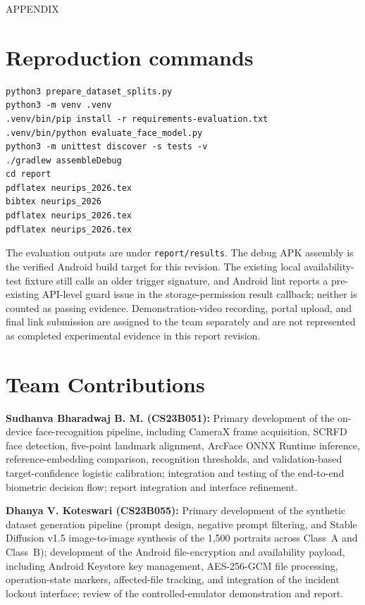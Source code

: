 \documentclass{article}
\begin{document}



\newpage
{\Large APPENDIX}
\appendix
\section{Reproduction commands}

\begin{verbatim}
python3 prepare_dataset_splits.py
python3 -m venv .venv
.venv/bin/pip install -r requirements-evaluation.txt
.venv/bin/python evaluate_face_model.py
python3 -m unittest discover -s tests -v
./gradlew assembleDebug
cd report
pdflatex neurips_2026.tex
bibtex neurips_2026
pdflatex neurips_2026.tex
pdflatex neurips_2026.tex
\end{verbatim}

The evaluation outputs are under \texttt{report/results}. The debug APK assembly is the verified Android build target for this revision. The existing local availability-test fixture still calls an older trigger signature, and Android lint reports a pre-existing API-level guard issue in the storage-permission result callback; neither is counted as passing evidence. Demonstration-video recording, portal upload, and final link submission are assigned to the team separately and are not represented as completed experimental evidence in this report revision.

\section{Team Contributions}

\textbf{Sudhanva Bharadwaj B. M. (CS23B051):} Primary development of the on-device face-recognition pipeline, including CameraX frame acquisition, SCRFD face detection, five-point landmark alignment, ArcFace ONNX Runtime inference, reference-embedding comparison, recognition thresholds, and validation-based target-confidence logistic calibration; integration and testing of the end-to-end biometric decision flow; report integration and interface refinement.

\textbf{Dhanya V. Koteswari (CS23B055):} Primary development of the synthetic dataset generation pipeline (prompt design, negative prompt filtering, and Stable Diffusion v1.5 image-to-image synthesis of the 1,500 portraits across Class~A and Class~B); development of the Android file-encryption and availability payload, including Android Keystore key management, AES-256-GCM file processing, operation-state markers, affected-file tracking, and integration of the incident lockout interface; review of the controlled-emulator demonstration and report.
\end{document}
